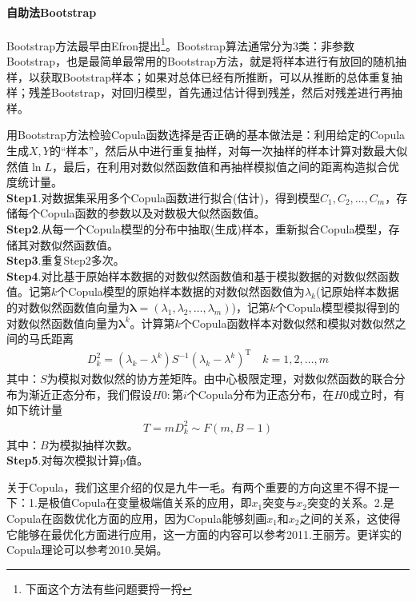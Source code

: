             \paragraph{自助法Bootstrap}Bootstrap方法最早由Efron提出\footnote{下面这个方法有些问题要捋一捋}。Bootstrap算法通常分为3类：非参数Bootstrap，也是最简单最常用的Bootstrap方法，就是将样本进行有放回的随机抽样，以获取Bootstrap样本；如果对总体已经有所推断，可以从推断的总体重复抽样；残差Bootstrap，对回归模型，首先通过估计得到残差，然后对残差进行再抽样。
            \par
            用Bootstrap方法检验Copula函数选择是否正确的基本做法是：利用给定的Copula生成$X,Y$的“样本”，然后从中进行重复抽样，对每一次抽样的样本计算对数最大似然值$\ln L$，最后，在利用对数似然函数值和再抽样模拟值之间的距离构造拟合优度统计量。\\
            \textbf{Step1}.对数据集采用多个Copula函数进行拟合(估计)，得到模型$C_1,C_2,\dots,C_m$，存储每个Copula函数的参数以及对数极大似然函数值。\\
            \textbf{Step2}.从每一个Copula模型的分布中抽取(生成)样本，重新拟合Copula模型，存储其对数似然函数值。\\
            \textbf{Step3}.重复Step2多次。\\
            \textbf{Step4}.对比基于原始样本数据的对数似然函数值和基于模拟数据的对数似然函数值。记第$k$个Copula模型的原始样本数据的对数似然函数值为$\lambda_k$(记原始样本数据的对数似然函数值向量为$\mathbf{\lambda} = (\lambda_1,\lambda_2,\dots,\lambda_m)$)，记第$k$个Copula模型模拟得到的对数似然函数值向量为$\mathbf{\lambda}^k$。计算第$k$个Copula函数样本对数似然和模拟对数似然之间的马氏距离
            \begin{align*}
            D_k^2 = (\lambda_k - \lambda^k) S^{-1}(\lambda_k - \lambda^k)^{\mathrm{T}} \quad k = 1,2,\dots,m
            \end{align*}
            其中：$S$为模拟对数似然的协方差矩阵。由中心极限定理，对数似然函数的联合分布为渐近正态分布，我们假设$H0:$第$i$个Copula分布为正态分布，在$H0$成立时，有如下统计量
            \begin{align*}
            T = mD_k^2 \sim F(m,B -1)
            \end{align*}
            其中：$B$为模拟抽样次数。\\
            \textbf{Step5}.对每次模拟计算p值。
            \par
            关于Copula，我们这里介绍的仅是九牛一毛。有两个重要的方向这里不得不提一下：1.是极值Copula在变量极端值关系的应用，即$x_1$突变与$x_2$突变的关系。2.是Copula在函数优化方面的应用，因为Copula能够刻画$x_1$和$x_2$之间的关系，这使得它能够在最优化方面进行应用，这一方面的内容可以参考2011.王丽芳\cite{Wang.2011}。更详实的Copula理论可以参考2010.吴娟\cite{Wu.2010}。

